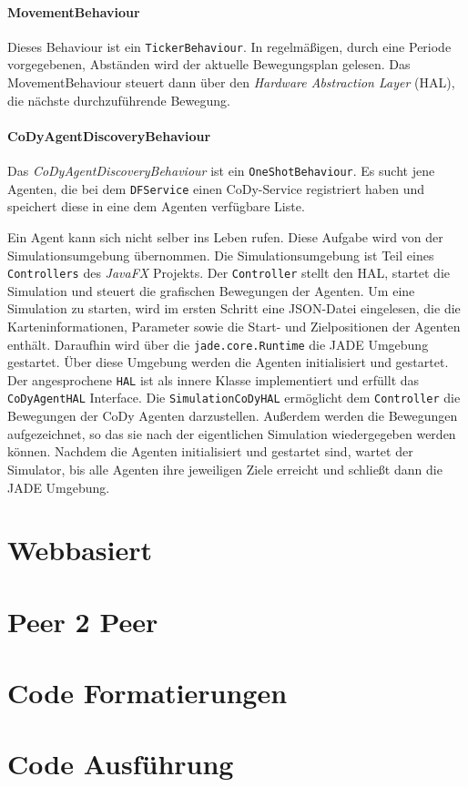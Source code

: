 \paragraph{MovementBehaviour}
Dieses Behaviour ist ein \texttt{TickerBehaviour}. In regelmäßigen, durch eine Periode vorgegebenen, Abständen wird der aktuelle Bewegungsplan gelesen. Das MovementBehaviour steuert dann über den \textit{Hardware Abstraction Layer} (HAL), die nächste durchzuführende Bewegung. 

\paragraph{CoDyAgentDiscoveryBehaviour}
Das \textit{CoDyAgentDiscoveryBehaviour} ist ein \texttt{OneShotBehaviour}. Es sucht jene Agenten, die bei dem \texttt{DFService} einen CoDy-Service registriert haben und speichert diese in eine dem Agenten verfügbare Liste.

Ein Agent kann sich nicht selber ins Leben rufen. Diese Aufgabe wird von der Simulationsumgebung übernommen. Die Simulationsumgebung ist Teil eines \texttt{Controllers} des \textit{JavaFX} Projekts. Der \texttt{Controller} stellt den HAL, startet die Simulation und steuert die grafischen Bewegungen der Agenten. Um eine Simulation zu starten, wird im ersten Schritt eine JSON-Datei eingelesen, die die Karteninformationen, Parameter sowie die Start- und Zielpositionen der Agenten enthält. Daraufhin wird über die \texttt{jade.core.Runtime} die JADE Umgebung gestartet. Über diese Umgebung werden die Agenten initialisiert und gestartet. 
Der angesprochene \texttt{HAL} ist als innere Klasse implementiert und erfüllt das \texttt{CoDyAgentHAL} Interface. Die \texttt{SimulationCoDyHAL} ermöglicht dem \texttt{Controller} die Bewegungen der CoDy Agenten darzustellen. Außerdem werden die Bewegungen aufgezeichnet, so das sie nach der eigentlichen Simulation wiedergegeben werden können. Nachdem die Agenten initialisiert und gestartet sind, wartet der Simulator, bis alle Agenten ihre jeweiligen Ziele erreicht und schließt dann die JADE Umgebung. 

\section{Webbasiert}
\label{chap:webbasiert}

\section{Peer 2 Peer}
\label{chap:p2p}

\section{Code Formatierungen}
\label{chap:codeformatierung}

\section{Code Ausführung}
\label{chap:codeausfuehrung}

